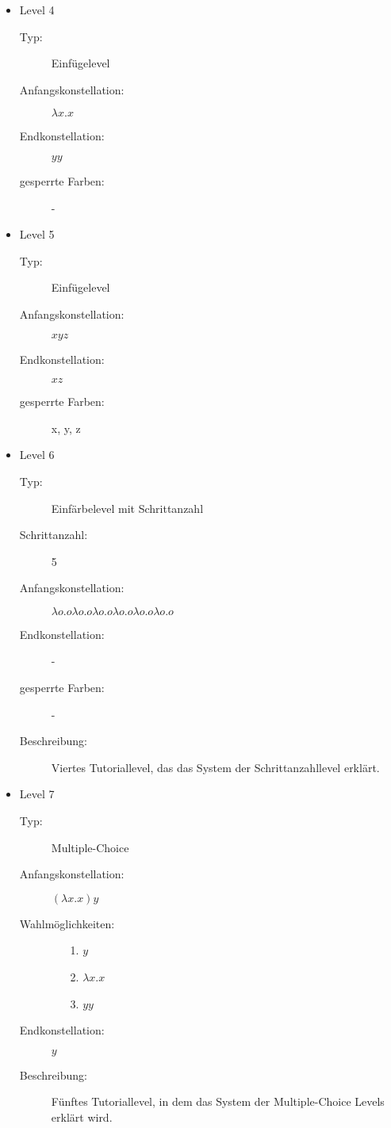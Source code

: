 \begin{itemize}
	\item{Level 4} 
		\begin{description}
			\item[Typ:] Einfügelevel
			\item[Anfangskonstellation:] \(\lambda x . x \)    
			\item[Endkonstellation:] \(y y\)
			\item[gesperrte Farben:] - 
		\end{description}

	\item{Level 5} 
		\begin{description}
			\item[Typ:] Einfügelevel
			\item[Anfangskonstellation:] \(x y z\)    
			\item[Endkonstellation:]  \(x z\)
			\item[gesperrte Farben:] x, y, z
		\end{description}

	\item{Level 6} 
		\begin{description}
			\item[Typ:] Einfärbelevel mit Schrittanzahl
			\item[Schrittanzahl:] 5
			\item[Anfangskonstellation:] \(\lambda o . o   \lambda o . o  \lambda o . o   \lambda o . o  \lambda o . o   \lambda o . o \) 
			\item[Endkonstellation:]  -
			\item[gesperrte Farben:] -
			\item[Beschreibung:] Viertes Tutoriallevel, das das System der Schrittanzahllevel erklärt.
		\end{description}

	\item{Level 7} 
		\begin{description}
			\item[Typ:] Multiple-Choice 
			\item[Anfangskonstellation:] \((\lambda x . x ) y\)    
			\item[Wahlmöglichkeiten:] \hfill
				\begin{itemize}
					\item[1.] \(y\)
					\item[2.] \(\lambda x . x \) 
					\item[3.] \(y y\)
				\end{itemize}
			\item[Endkonstellation:] \(y\)
			\item[Beschreibung:] Fünftes Tutoriallevel, in dem das System der Multiple-Choice Levels erklärt wird.
		\end{description}


\end{itemize}
